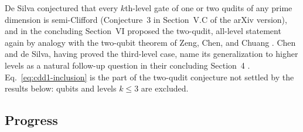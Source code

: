De Silva conjectured that every $k$th-level gate of one or two qudits of
any prime dimension is semi-Clifford (Conjecture~3 in Section~V.C of the arXiv
version), and in the concluding Section~VI proposed the two-qudit, all-level
statement again by analogy with the two-qubit theorem of Zeng, Chen, and Chuang
.  Chen and de Silva, having proved the
third-level case, name its generalization to higher levels as a natural
follow-up question in their concluding Section~4
.  Eq.~\eqref{eq:cdd1-inclusion} is the part
of the two-qudit conjecture not settled by the results below: qubits and levels
$k\leq3$ are excluded.

\subsection*{Progress}

